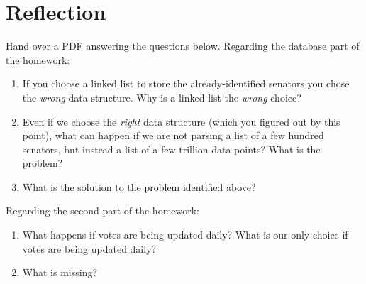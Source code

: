 \documentclass[11pt]{article}
\begin{document}
\section{Reflection}

Hand over a PDF answering the questions below. Regarding the database part of the homework:
\begin{enumerate}
	\item If you choose a linked list to store the already-identified senators you chose the \emph{wrong} data structure. Why is a linked list the \emph{wrong} choice?

	\item Even if we choose the \emph{right} data structure (which you figured out by this point), what can happen if we are not parsing a list of a few hundred senators, but instead a list of a few trillion data points? What is the problem?

	\item What is the solution to the problem identified above?
\end{enumerate}

Regarding the second part of the homework:
\begin{enumerate}
	\item What happens if votes are being updated daily? What is our only choice if votes are being updated daily?

	\item What is missing?
\end{enumerate}



\end{document}
